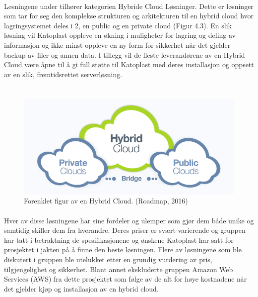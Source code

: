 \paragraph{} Løsningene under tilhører kategorien Hybride Cloud Løsninger. Dette er løsninger som tar for seg den komplekse strukturen og arkitekturen til en hybrid cloud hvor lagringsystemet deles i 2, en public og en private cloud (Figur 4.3). En slik løsning vil Katoplast oppleve en økning i muligheter for lagring og deling av informasjon og ikke minst oppleve en ny form for sikkerhet når det gjelder backup av filer og annen data. I tillegg vil de fleste leverandørene av en Hybrid Cloud være åpne til å gi full støtte til Katoplast med deres installasjon og oppsett av en slik, fremtidsrettet serverløsning. 

\section*{}
\begin{figure}[H]
\centering
\includegraphics[width=6.5in]{Bilder/Hybrid-cloud.jpg}
\caption{Forenklet figur av en Hybrid Cloud. (Roadmap, 2016)}
\end{figure}

\paragraph{} Hver av disse løsningene har sine fordeler og ulemper som gjør dem både unike og samtidig skiller dem fra hverandre. Deres priser er svært varierende og gruppen har tatt i betraktning de spesifikasjonene og ønskene Katoplast har satt for prosjektet i jakten på å finne den beste løsningen. Flere av løsningene som ble diskutert i gruppen ble utelukket etter en grundig vurdering av pris, tilgjengelighet og sikkerhet. Blant annet ekskluderte gruppen Amazon Web Services (AWS) fra dette prosjektet som følge av de alt for høye kostnadene når det gjelder kjøp og installasjon av en hybrid cloud.

